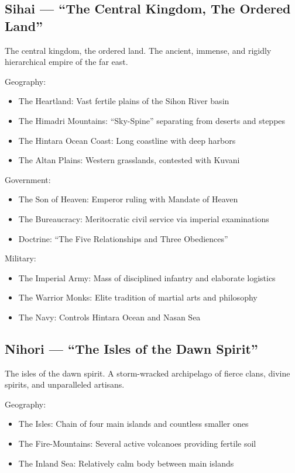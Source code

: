 \subsection{Sihai --- ``The Central Kingdom, The Ordered Land''}
\label{sec:sihai}

The central kingdom, the ordered land. The ancient, immense, and rigidly hierarchical empire of the far east.

Geography:
\begin{itemize}
    \item The Heartland: Vast fertile plains of the Sihon River basin
    \item The Himadri Mountains: ``Sky-Spine'' separating from deserts and steppes
    \item The Hintara Ocean Coast: Long coastline with deep harbors
    \item The Altan Plains: Western grasslands, contested with Kuvani
\end{itemize}

Government:
\begin{itemize}
    \item The Son of Heaven: Emperor ruling with Mandate of Heaven
    \item The Bureaucracy: Meritocratic civil service via imperial examinations
    \item Doctrine: ``The Five Relationships and Three Obediences''
\end{itemize}

Military:
\begin{itemize}
    \item The Imperial Army: Mass of disciplined infantry and elaborate logistics
    \item The Warrior Monks: Elite tradition of martial arts and philosophy
    \item The Navy: Controls Hintara Ocean and Nasan Sea
\end{itemize}

\subsection{Nihori --- ``The Isles of the Dawn Spirit''}
\label{sec:nihon}

The isles of the dawn spirit. A storm-wracked archipelago of fierce clans, divine spirits, and unparalleled artisans.

Geography:
\begin{itemize}
    \item The Isles: Chain of four main islands and countless smaller ones
    \item The Fire-Mountains: Several active volcanoes providing fertile soil
    \item The Inland Sea: Relatively calm body between main islands
\end{itemize}

